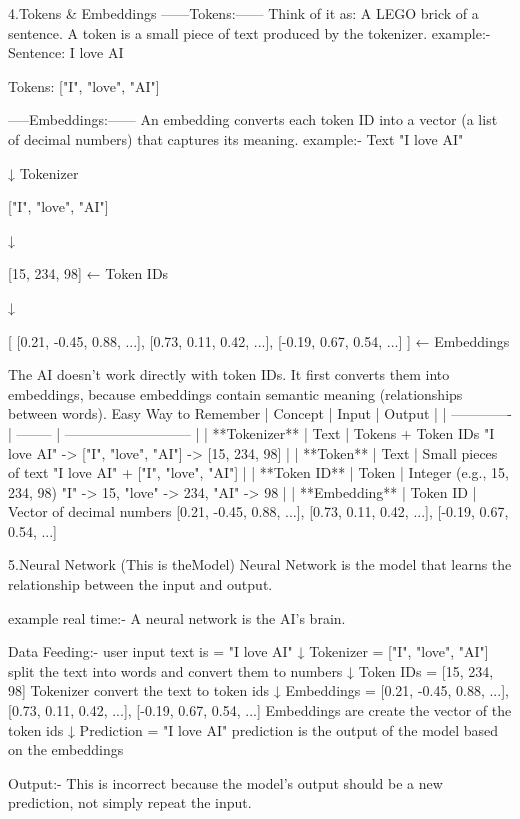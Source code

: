 4.Tokens & Embeddings
------Tokens:------
Think of it as: A LEGO brick of a sentence.
 A token is a small piece of text produced by the tokenizer.
 example:-
 Sentence:
 I love AI
 
 Tokens:
 ["I", "love", "AI"]


 -----Embeddings:------
 An embedding converts each token ID into a vector (a list of decimal numbers) that captures its meaning.
 example:-
 Text
 "I love AI"
 
         ↓
 Tokenizer
 
 ["I", "love", "AI"]
 
         ↓
 
 [15, 234, 98]        ← Token IDs
 
         ↓
 
 [
  [0.21, -0.45, 0.88, ...],
  [0.73,  0.11, 0.42, ...],
  [-0.19, 0.67, 0.54, ...]
 ]                     ← Embeddings


The AI doesn't work directly with token IDs. It first converts them into embeddings,
because embeddings contain semantic meaning (relationships between words).
Easy Way to Remember
| Concept       | Input    | Output                      |
| ------------- | -------- | --------------------------- |
| **Tokenizer** | Text     | Tokens + Token IDs "I love AI" -> ["I", "love", "AI"] -> [15, 234, 98]          |
| **Token**     | Text     | Small pieces of text "I love AI" + ["I", "love", "AI"]        |
| **Token ID**  | Token    | Integer (e.g., 15, 234, 98) "I" -> 15, "love" -> 234, "AI" -> 98 |
| **Embedding** | Token ID | Vector of decimal numbers [0.21, -0.45, 0.88, ...], [0.73,  0.11, 0.42, ...], [-0.19, 0.67, 0.54, ...] 





5.Neural Network (This is theModel)
Neural Network is the model that learns the relationship between the input and output.

example real time:-
A neural network is the AI's brain.

Data Feeding:-
 user input text is  = "I love AI"
 ↓
 Tokenizer = ["I", "love", "AI"] split the text into words and convert them to numbers
 ↓
 Token IDs = [15, 234, 98] Tokenizer convert the text to token ids
 ↓
 Embeddings = [0.21, -0.45, 0.88, ...], [0.73,  0.11, 0.42, ...], [-0.19, 0.67, 0.54, ...] Embeddings are create the vector of the token ids
 ↓
 Prediction = "I love AI" prediction is the output of the model based on the embeddings

Output:-
This is incorrect because the model's output should be a new prediction, not simply repeat the input.

